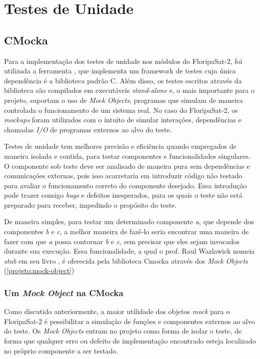         

    \section{Testes de Unidade}
    \label{projeto:testes}
        \subsection{CMocka}
        \label{projeto:cmocka}
            Para a implementação dos testes de unidade nos módulos do FloripaSat-2, foi utilizada a ferramenta \cite{cmocka}, que implementa um framework de testes cuja única dependência é a biblioteca padrão C. Além disso, os testes escritos através da biblioteca são compilados em executáveis \textit{stand-alone} e, o mais importante para o projeto, suportam o uso de \textit{Mock Objects}, programas que simulam de maneira controlada o funcionamento de um sistema real. No caso do FloripaSat-2, os \textit{mockups} foram utilizados com o intuito de simular interações, dependências e chamadas \textit{I/O} de programas externos ao alvo do teste.
            
            Testes de unidade tem melhores precisão e eficiência quando empregados de maneira isolada e contida, para testar componentes e funcionalidades singulares. O componente sob teste deve ser analisado de maneira pura sem dependências e comunicações externas, pois isso acarretaria em introduzir código não testado para avaliar o funcionamento correto do componente desejado. Essa introdução pode trazer consigo \textit{bugs} e defeitos inesperados, para os quais o teste não está preparado para receber, impedindo o propósito do teste.
            
            De maneira simples, para testar um determinado componente \textit{a}, que depende dos componentes \textit{b} e \textit{c}, a melhor maneira de fazê-lo seria encontrar uma maneira de fazer com que \textit{a} possa contornar \textit{b} e \textit{c}, sem precisar que eles sejam invocados durante sua execução. Essa funcionalidade, a qual o prof. Raul Wazlawick nomeia \textit{stub} em seu livro \cite{engenharia-software}, é oferecida pela biblioteca Cmocka através dos \textit{Mock Objects} (\autoref{projeto:mock-object})
            
            \subsubsection{Um \textit{Mock Object} na CMocka}
            \label{projeto:mock-object}
                Como discutido anteriormente, a maior utilidade dos objetos \textit{mock} para o FloripaSat-2 é possibilitar a simulação de funções e componentes externos ao alvo do teste. Os \textit{Mock Objects} entram no projeto como forma de isolar o teste, de forma que qualquer erro ou defeito de implementação encontrado esteja localizado no próprio componente a ser testado.
                
